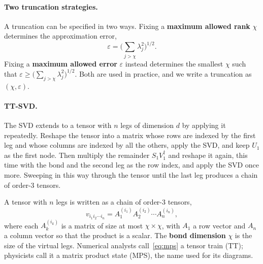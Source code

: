 \paragraph{Two truncation strategies.}
A truncation can be specified in two ways. Fixing a \textbf{maximum allowed
rank} $\chi$ determines the approximation error,
\begin{equation}
  \varepsilon = \Big(\sum_{j > \chi} \lambda_j^2\Big)^{1/2}.
  \label{eq:trunc-error}
\end{equation}
Fixing a \textbf{maximum allowed error} $\varepsilon$ instead determines the
smallest $\chi$ such that
$\varepsilon \ge \big(\sum_{j > \chi} \lambda_j^2\big)^{1/2}$. Both are used in
practice, and we write a truncation as $(\chi,\varepsilon)$.

\paragraph{TT-SVD.}
The SVD extends to a tensor with $n$ legs of dimension $d$ by applying it
repeatedly. Reshape the tensor into a matrix whose rows are indexed by the first
leg and whose columns are indexed by all the others, apply the SVD, and keep
$U_1$ as the first node. Then multiply the remainder $S_1 V_1^{\dagger}$ and
reshape it again, this time with the bond and the second leg as the row index,
and apply the SVD once more. Sweeping in this way through the tensor until the
last leg produces a chain of order-3 tensors.

\begin{definition}
  A tensor with $n$ legs is written as a chain of order-3 tensors,
  \begin{equation}
    v_{i_1 i_2 \cdots i_n}
      = A^{(i_1)}_1 A^{(i_2)}_2 \cdots A^{(i_n)}_n ,
    \label{eq:mps}
  \end{equation}%
  where each $A^{(i_k)}_k$ is a matrix of size at most $\chi \times \chi$, with
  $A_1$ a row vector and $A_n$ a column vector so that the product is a scalar.
  The \textbf{bond dimension} $\chi$ is the size of the virtual legs. Numerical
  analysts call~\eqref{eq:mps} a tensor train (TT); physicists call it a matrix
  product state (MPS), the name used for its diagrams.
\end{definition}

